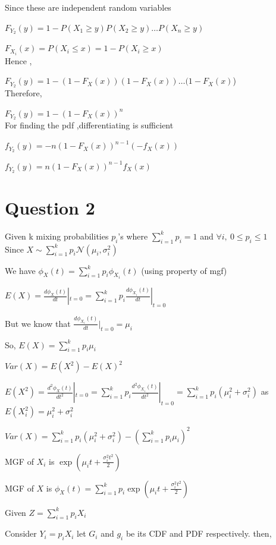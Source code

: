 \documentclass{article}
\begin{document}
    Since these are independent random variables\par 
    $F_{Y_2}(y) = 1 - P(X_1 \geq y)  P(X_2 \geq y)   \dots P(X_n \geq y)$\par 
    $F_{X_i}(x) = P(X_i \leq x) = 1 - P(X_i \geq x)$\\
    Hence ,\par 
    $F_{Y_2}(y) = 1 - (1-F_X(x))(1-F_X(x))  \dots (1-F_X(x)$)\\
    Therefore,\par 
    $F_{Y_2}(y) = 1 -{(1 -F_X(x))}^n$\\
    For finding the pdf ,differentiating is sufficient\par
    $f_{Y_2}(y) = -n{(1-F_X(x))}^{n-1}(-f_X(x))$\par 
    $f_{Y_2}(y) = n{(1-F_X(x))}^{n-1}f_X(x)$
\section*{Question 2}
    Given k mixing probabilities $p_i$'s where $\sum_{i=1}^k p_i = 1$ and $\forall i ,\  0 \leq p_i \leq 1$\\
    Since $X \sim  \sum_{i=1}^k p_i\mathcal{N}(\mu_i,\sigma_i^2)$\par
    We have $\phi_{X}(t) = \sum_{i=1}^k p_{i}\phi_{X_i}(t)$                     (using property of mgf)\par
    $E(X) = \frac{d{\phi_X(t)}}{d{t}}|_{t=0} = \sum_{i=1}^k p_i\frac{d{\phi_{X_i}(t)}}{d{t}}|_{t=0}$\par
    But we know that $\frac{d{\phi_{X_i}(t)}}{d{t}}|_{t=0} = \mu_i$\par
    So, $E(X) = \sum_{i=1}^k p_i\mu_i$\par
    $Var(X) =E(X^2) - E(X)^2$\par
    $E(X^2) = \frac{d^2{\phi_X(t)}}{d{t}^2}|_{t=0}=\sum_{i=1}^k p_i \frac{d^2{\phi_{X_i}(t)}}{d{t}^2}|_{t=0} = \sum_{i=1}^kp_i(\mu_i^2 + \sigma_i^2)$  \hspace{4em}as $E(X_i^2) = \mu_i^2 +\sigma_i^2$\par
    $Var(X) = \sum_{i=1}^kp_i(\mu_i^2 + \sigma_i^2) - (\sum_{i=1}^kp_i\mu_i)^2$\par
    MGF of $X_i$ is $\exp(\mu_it + \frac{\sigma_i^2t^2}{2})$ \par
    MGF of $X$ is $\phi_X(t) = \sum_{i=1}^kp_i\exp(\mu_it + \frac{\sigma_i^2t^2}{2})$ \par
    Given $Z = \sum_{i=1}^kp_iX_i$\par
    Consider $Y_i = p_iX_i$ let $G_i$ and $g_i$ be its CDF and PDF respectively. then,\par
\end{document}
